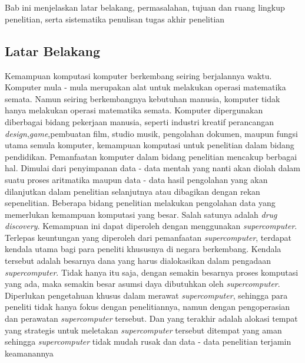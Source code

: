 
\chapter{\babSatu}
Bab ini menjelaskan latar belakang, permasalahan, tujuan dan ruang lingkup 
penelitian, serta sistematika penulisan tugas akhir penelitian 

\section{Latar Belakang}
Kemampuan komputasi komputer berkembang seiring berjalannya waktu. Komputer mula - mula merupakan alat untuk melakukan operasi matematika semata. Namun seiring berkembangnya kebutuhan manusia, komputer tidak hanya melakukan operasi matematika semata. Komputer dipergunakan diberbagai bidang pekerjaan manusia, seperti industri kreatif perancangan \textit{design},\textit{game},pembuatan film, studio musik, pengolahan dokumen, maupun fungsi utama semula komputer, kemampuan komputasi untuk penelitian dalam bidang pendidikan.
\newline
\hspace{1.5cm}Pemanfaatan komputer dalam bidang penelitian mencakup berbagai hal. Dimulai dari penyimpanan data - data mentah yang nanti akan diolah dalam suatu proses aritmatika maupun data - data hasil pengolahan yang akan dilanjutkan dalam penelitian selanjutnya atau dibagikan dengan rekan sepenelitian. Beberapa bidang penelitian melakukan pengolahan data yang memerlukan kemampuan komputasi yang besar. Salah satunya adalah \textit{drug discovery}. Kemampuan ini dapat diperoleh dengan menggunakan \textit{supercomputer}. Terlepas keuntungan yang diperoleh dari pemanfaatan \textit{supercomputer}, terdapat kendala utama bagi para peneliti khususnya di negara berkembang. Kendala tersebut adalah besarnya dana yang harus dialokasikan dalam pengadaan \textit{supercomputer}. Tidak hanya itu saja, dengan semakin besarnya proses komputasi yang ada, maka semakin besar asumsi daya dibutuhkan oleh \textit{supercomputer}. Diperlukan pengetahuan khusus dalam merawat \textit{supercomputer}, sehingga para peneliti tidak hanya fokus dengan penelitiannya, namun dengan pengoperasian dan perawatan \textit{supercomputer} tersebut. Dan yang terakhir adalah alokasi tempat yang strategis untuk meletakan \textit{supercomputer} tersebut ditempat yang aman sehingga \textit{supercomputer} tidak mudah rusak dan data - data penelitian terjamin keamanannya 
